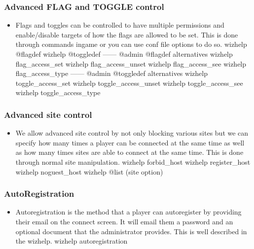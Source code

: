 \documentclass[letterpaper,10pt,english]{sphinxmanual}
\begin{document}
\subsubsection{Advanced FLAG and TOGGLE control}
\label{\detokenize{features:advanced-flag-and-toggle-control}}\begin{itemize}
\item {} 
\sphinxAtStartPar
Flags and toggles can be controlled to have multiple permissions
and enable/disable targets of how the flags are allowed to be
set.  This is done through commands in\sphinxhyphen{}game or you can use
conf file options to do so.
\sphinxhyphen{} wizhelp @flagdef
\sphinxhyphen{} wizhelp @toggledef
——\sphinxhyphen{} @admin @flagdef alternatives
\sphinxhyphen{} wizhelp flag\_access\_set
\sphinxhyphen{} wizhelp flag\_access\_unset
\sphinxhyphen{} wizhelp flag\_access\_see
\sphinxhyphen{} wizhelp flag\_access\_type
——\sphinxhyphen{} @admin @toggledef alternatives
\sphinxhyphen{} wizhelp toggle\_access\_set
\sphinxhyphen{} wizhelp toggle\_access\_unset
\sphinxhyphen{} wizhelp toggle\_access\_see
\sphinxhyphen{} wizhelp toggle\_access\_type

\end{itemize}


\subsubsection{Advanced site control}
\label{\detokenize{features:advanced-site-control}}\begin{itemize}
\item {} 
\sphinxAtStartPar
We allow advanced site control by not only blocking various sites
but we can specify how many times a player can be connected at the
same time as well as how many times sites are able to connect at
the same time.  This is done through normal site manipulation.
\sphinxhyphen{} wizhelp forbid\_host
\sphinxhyphen{} wizhelp register\_host
\sphinxhyphen{} wizhelp noguest\_host
\sphinxhyphen{} wizhelp @list (site option)

\end{itemize}


\subsubsection{Auto\sphinxhyphen{}Registration}
\label{\detokenize{features:auto-registration}}\begin{itemize}
\item {} 
\sphinxAtStartPar
Autoregistration is the method that a player can auto\sphinxhyphen{}register
by providing their email on the connect screen.  It will email
them a password and an optional document that the administrator
provides.  This is well described in the wizhelp.
\sphinxhyphen{} wizhelp autoregistration

\end{itemize}
\end{document}
